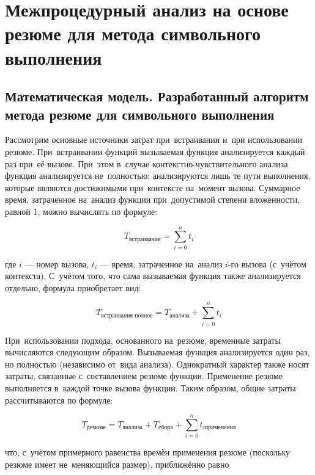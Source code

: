 \chapter{Межпроцедурный анализ на основе резюме для метода символьного выполнения} \label{chapt2}

\section{Математическая модель. Разработанный алгоритм метода резюме для символьного выполнения}

Рассмотрим основные источники затрат при~встраивании и~при использовании резюме. При~встраивании функций вызываемая функция анализируется каждый раз при~её вызове. При~этом в~случае контекстно-чувствительного анализа функция анализируется не~полностью: анализируются лишь те пути выполнения, которые являются достижимыми при~контексте на~момент вызова. Суммарное время, затраченное на~анализ функции при~допустимой степени вложенности, равной 1, можно вычислить по формуле:

\begin{equation}
 T_{\text{встраивания}} = \sum_{i = 0}^{n} t_i 
\end{equation}

где $i$ — номер вызова, $t_i$ — время, затраченное на~анализ $i$-го вызова (с~учётом контекста). С~учётом того, что сама вызываемая функция также анализируется отдельно, формула приобретает вид:

\begin{equation}
 T_{\text{встраивания полное}} = T_{\text{анализа}} + \sum_{i = 0}^{n} t_i 
\end{equation}

При~использовании подхода, основанного на~резюме, временные затраты вычисляются следующим образом. Вызываемая функция анализируется один раз, но полностью (независимо от~вида анализа). Однократный характер также носят затраты, связанные с~составлением резюме функции. Применение резюме выполняется в~каждой точке вызова функции. Таким образом, общие затраты рассчитываются по формуле:

\begin{equation}
 T_{\text{резюме}} = T_{\text{анализа}} + T_{\text{сбора}} + \sum_{i = 0}^{n} t_{i \text{применения}}
\end{equation}

что, с~учётом примерного равенства времён применения резюме (поскольку резюме имеет не~меняющийся размер), приближённо равно


